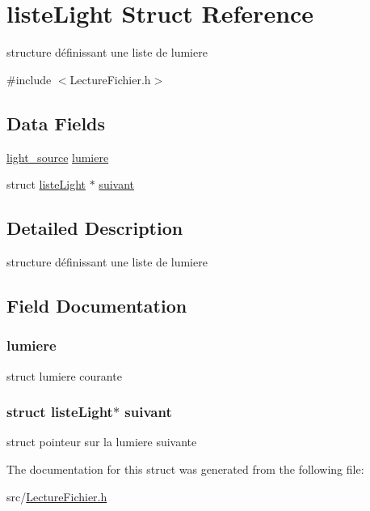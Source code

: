 \hypertarget{structliste_light}{
\section{listeLight Struct Reference}
\label{structliste_light}
}


structure définissant une liste de lumiere  




{\ttfamily \#include $<$LectureFichier.h$>$}

\subsection*{Data Fields}
\begin{DoxyCompactItemize}
\item 
\hyperlink{structlight__source}{light\_\-source} \hyperlink{structliste_light_a09e538ace5e9abbe6272afeff9bf4b47}{lumiere}
\item 
struct \hyperlink{structliste_light}{listeLight} $\ast$ \hyperlink{structliste_light_a5dd3d9b5cccb3e48a4b368eaaf8f7561}{suivant}
\end{DoxyCompactItemize}


\subsection{Detailed Description}
structure définissant une liste de lumiere 

\subsection{Field Documentation}
\hypertarget{structliste_light_a09e538ace5e9abbe6272afeff9bf4b47}{
\subsubsection[{lumiere}]{ {\bf lumiere}}}
\label{structliste_light_a09e538ace5e9abbe6272afeff9bf4b47}
struct lumiere courante \hypertarget{structliste_light_a5dd3d9b5cccb3e48a4b368eaaf8f7561}{
\subsubsection[{suivant}]{\setlength{\rightskip}{0pt plus 5cm}struct {\bf listeLight}$\ast$ {\bf suivant}}}
\label{structliste_light_a5dd3d9b5cccb3e48a4b368eaaf8f7561}
struct pointeur sur la lumiere suivante 

The documentation for this struct was generated from the following file:\begin{DoxyCompactItemize}
\item 
src/\hyperlink{_lecture_fichier_8h}{LectureFichier.h}\end{DoxyCompactItemize}

